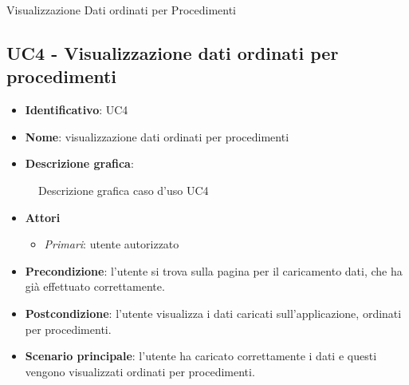 
\begin{usecase}{4}{Visualizzazione Dati ordinati per Procedimenti}
  \label{uc:visualizzazione-dati-procedimenti}
\end{usecase}


\subsection{UC4 - Visualizzazione dati ordinati per procedimenti}
\begin{itemize}
  \item \textbf{Identificativo}: UC4
  \item \textbf{Nome}: visualizzazione dati ordinati per procedimenti
  \item \textbf{Descrizione grafica}:
\end{itemize}

\begin{figure}[h]
  \centering
  \caption{Descrizione grafica caso d'uso UC4}
\end{figure}

\begin{itemize}
  \item \textbf{Attori}
        \begin{itemize}
          \item \textit{Primari}: utente autorizzato
        \end{itemize}
  \item \textbf{Precondizione}: l'utente si trova sulla pagina per il caricamento dati, che ha già effettuato correttamente.
  \item \textbf{Postcondizione}: l'utente visualizza i dati caricati sull'applicazione, ordinati per procedimenti.
  \item \textbf{Scenario principale}: l'utente ha caricato correttamente i dati e questi vengono visualizzati ordinati per procedimenti.
\end{itemize}
\newpage